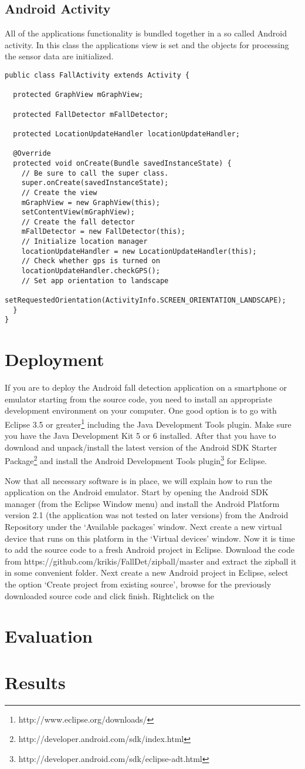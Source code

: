 \documentclass[a4paper, 10pt]{article}
\begin{document}
\subsection{Android Activity}
All of the applications functionality is bundled together in a so called Android activity. In this class the applications view is set and the objects for processing the sensor data are initialized.
\begin{lstlisting}
public class FallActivity extends Activity {

  protected GraphView mGraphView;

  protected FallDetector mFallDetector;

  protected LocationUpdateHandler locationUpdateHandler;

  @Override
  protected void onCreate(Bundle savedInstanceState) {
    // Be sure to call the super class.
    super.onCreate(savedInstanceState);
    // Create the view
    mGraphView = new GraphView(this);
    setContentView(mGraphView);
    // Create the fall detector
    mFallDetector = new FallDetector(this);
    // Initialize location manager
    locationUpdateHandler = new LocationUpdateHandler(this);
    // Check whether gps is turned on
    locationUpdateHandler.checkGPS();
    // Set app orientation to landscape
    setRequestedOrientation(ActivityInfo.SCREEN_ORIENTATION_LANDSCAPE);
  }
}
\end{lstlisting}

\section{Deployment}
If you are to deploy the Android fall detection application on a smartphone or emulator starting from the source code, you need to install an appropriate development environment on your computer. One good option is to go with Eclipse 3.5 or greater\footnote{http://www.eclipse.org/downloads/} including the Java Development Tools plugin. Make sure you have the Java Development Kit 5 or 6 installed. After that you have to download and unpack/install the latest version of the Android SDK Starter Package\footnote{http://developer.android.com/sdk/index.html} and install the Android Development Tools plugin\footnote{http://developer.android.com/sdk/eclipse-adt.html} for Eclipse. 

Now that all necessary software is in place, we will explain how to run the application on the Android emulator. Start by opening the Android SDK manager (from the Eclipse Window menu) and install the Android Platform version 2.1 (the application was not tested on later versions) from the Android Repository under the `Available packages' window. Next create a new virtual device that runs on this platform in the `Virtual devices' window. Now it is time to add the source code to a fresh Android project in Eclipse. Download the code from https://github.com/krikis/FallDet/zipball/master and extract the zipball it in some convenient folder. Next create a new Android project in Eclipse, select the option `Create project from existing source', browse for the previously downloaded source code and click finish. Rightclick on the  




\section{Evaluation}
\section{Results}
\end{document}
